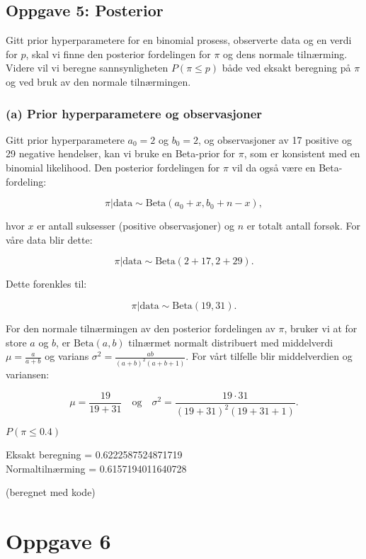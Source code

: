 \documentclass{article}
\begin{document}
\subsection{Oppgave 5: Posterior}

Gitt prior hyperparametere for en binomial prosess, observerte data og en verdi for \(p\), skal vi finne den posterior fordelingen for \(\pi\) og dens normale tilnærming. Videre vil vi beregne sannsynligheten \(P(\pi \leq p)\) både ved eksakt beregning på \(\pi\) og ved bruk av den normale tilnærmingen.

\subsubsection*{(a) Prior hyperparametere og observasjoner}
Gitt prior hyperparametere \(a_0 = 2\) og \(b_0 = 2\), og observasjoner av 17 positive og 29 negative hendelser, kan vi bruke en Beta-prior for \(\pi\), som er konsistent med en binomial likelihood. Den posterior fordelingen for \(\pi\) vil da også være en Beta-fordeling:

\[
\pi | \text{{data}} \sim \text{{Beta}}(a_0 + x, b_0 + n - x),
\]

hvor \(x\) er antall suksesser (positive observasjoner) og \(n\) er totalt antall forsøk. For våre data blir dette:

\[
\pi | \text{{data}} \sim \text{{Beta}}(2 + 17, 2 + 29).
\]

Dette forenkles til:

\[
\pi | \text{{data}} \sim \text{{Beta}}(19, 31).
\]

For den normale tilnærmingen av den posterior fordelingen av \(\pi\), bruker vi at for store \(a\) og \(b\), er \(\text{{Beta}}(a, b)\) tilnærmet normalt distribuert med middelverdi \(\mu = \frac{a}{a + b}\) og varians \(\sigma^2 = \frac{ab}{(a + b)^2(a + b + 1)}\). For vårt tilfelle blir middelverdien og variansen:

\[
\mu = \frac{19}{19 + 31} \quad \text{{og}} \quad \sigma^2 = \frac{19 \cdot 31}{(19 + 31)^2(19 + 31 + 1)}.
\]

\(P(\pi \leq 0.4)\) 

Eksakt beregning = 0.6222587524871719 \\
Normaltilnærming = 0.6157194011640728

(beregnet med kode)

\section{Oppgave 6}
\end{document}
